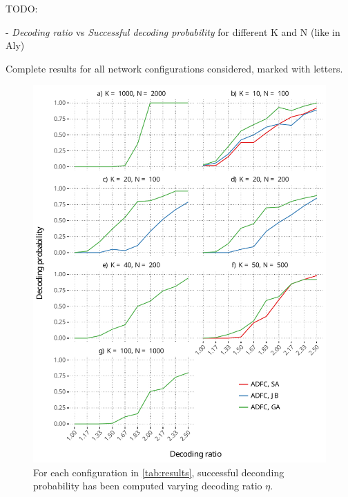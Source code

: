 \documentclass[12pt,journal,draftclsnofoot,onecolumn]{IEEEtran}
\begin{document}
TODO:

- \emph{Decoding ratio} vs \emph{Successful decoding probability} for different K and N (like in Aly)

\begin{table}[htp]
	\centering
	
	\caption{Complete results for all network configurations considered, marked with letters.}
	\label{tab:results}
\end{table}

\begin{figure}[htp]
	\label{fig:eta_vs_prob_adfc_only}
	\includegraphics[]{figures/eta_vs_prob_adfc_only.pdf}
	\caption{For each configuration in \autoref{tab:results}, successful deconding probability has been computed varying decoding ratio $\eta$.}
\end{figure}
\end{document}
